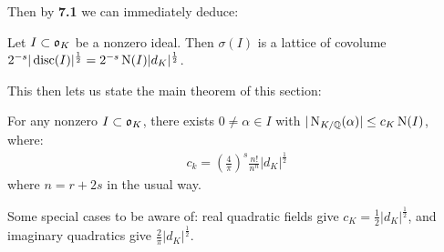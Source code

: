 \documentclass[10pt,a4paper]{article}
\begin{document}
Then by \textbf{7.1} we can immediately deduce:
\begin{corollary}
Let $I \subset \mathfrak{o}_K$ be a nonzero ideal. Then $\sigma(I)$ is a lattice of covolume $2^{-s}|\operatorname{disc}(I)|^{\frac12} = 2^{-s}\operatorname{N}(I)|d_K|^{\frac12}$.
\end{corollary}
This then lets us state the main theorem of this section:
\begin{theorem}
For any nonzero $I \subset \mathfrak{o}_K$, there exists $0 \neq \alpha \in I$ with $|\operatorname{N}_{K/\mathbb{Q}}(\alpha)| \leq c_K\operatorname{N}(I)$, where:
\begin{align*}
c_k = \left(\frac{4}{\pi}\right)^s \frac{n!}{n^n}|d_K|^{\frac12}
\end{align*}
where $n = r+2s$ in the usual way.
\end{theorem}
Some special cases to be aware of: real quadratic fields give $c_K = \frac{1}{2}|d_K|^{\frac12}$, and imaginary quadratics give $\frac{2}{\pi}|d_K|^{\frac12}$.
\end{document}
